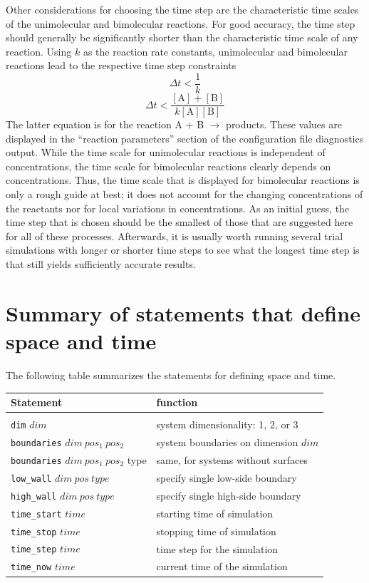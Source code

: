 \documentclass {scrbook}
\newcommand {\ttt} {\texttt}
\begin{document}
Other considerations for choosing the time step are the characteristic time scales of the unimolecular and bimolecular reactions. For good accuracy, the time step should generally be significantly shorter than the characteristic time scale of any reaction. Using $k$ as the reaction rate constants, unimolecular and bimolecular reactions lead to the respective time step constraints
$$\Delta t < \frac{1}{k}$$
$$\Delta t < \frac{[\textrm{A}]+[\textrm{B}]}{k[\textrm{A}][\textrm{B}]}$$
The latter equation is for the reaction A + B $\rightarrow$ products. These values are displayed in the ``reaction parameters'' section of the configuration file diagnostics output. While the time scale for unimolecular reactions is independent of concentrations, the time scale for bimolecular reactions clearly depends on concentrations. Thus, the time scale that is displayed for bimolecular reactions is only a rough guide at best; it does not account for the changing concentrations of the reactants nor for local variations in concentrations.
As an initial guess, the time step that is chosen should be the smallest of those that are suggested here for all of these processes. Afterwards, it is usually worth running several trial simulations with longer or shorter time steps to see what the longest time step is that still yields sufficiently accurate results.

\section{Summary of statements that define space and time}

The following table summarizes the statements for defining space and time.

\begin{longtable}[c]{ll}
Statement & function\\
\hline\\
\ttt{dim} $dim$ & system dimensionality: 1, 2, or 3\\
\ttt{boundaries} $dim\ pos_1\ pos_2$ & system boundaries on dimension $dim$\\
\ttt{boundaries} $dim\ pos_1\ pos_2$ type & same, for systems without surfaces\\
\ttt{low\_wall} $dim\ pos\ type$ & specify single low-side boundary\\
\ttt{high\_wall} $dim\ pos\ type$ & specify single high-side boundary\\
\ttt{time\_start} $time$ & starting time of simulation\\
\ttt{time\_stop} $time$ & stopping time of simulation\\
\ttt{time\_step} $time$ & time step for the simulation\\
\ttt{time\_now} $time$ & current time of the simulation
\end{longtable}
\end{document}
